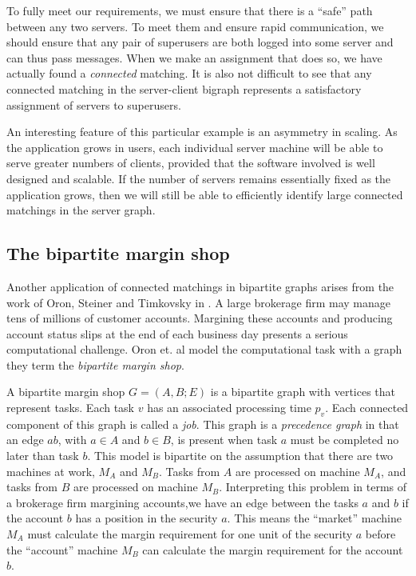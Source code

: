 To fully meet our requirements, we must ensure that there is a ``safe'' path between any two servers.  To meet them and ensure rapid communication, we should ensure that any pair of superusers are both logged into some server and can thus pass messages.  When we make an assignment that does so, we have actually found a {\it connected} matching.  It is also not difficult to see that any connected matching in the server-client bigraph represents a satisfactory assignment of servers to superusers. 

An interesting feature of this particular example is an asymmetry in scaling.  As the application grows in users, each individual server machine will be able to serve greater numbers of clients, provided that the software involved is well designed and scalable.  If the number of servers remains essentially fixed as the application grows, then we will still be able to efficiently identify large connected matchings in the server graph.
	\subsection{The bipartite margin shop}

Another application of connected matchings in bipartite graphs arises from the work of Oron, Steiner and Timkovsky in \cite{OST}.  A large brokerage firm may manage tens of millions of customer accounts.  Margining these accounts and producing account status slips at the end of each business day presents a serious computational challenge.  Oron et. al model the computational task with a graph they term the {\it bipartite margin shop}.

A bipartite margin shop $G = (A, B; E)$ is a bipartite graph with vertices that represent tasks.  Each task $v$ has an associated processing time $p_v$.  Each connected component of this graph is called a {\it job}.  This graph is a {\it precedence graph}  in that an edge $ab$, with $a \in A$ and $b\in B$, is present when task $a$ must be completed no later than task $b$.  This model is bipartite on the assumption that there are two machines at work, $M_A$ and $M_B$.  Tasks from $A$ are processed on machine $M_A$, and tasks from $B$ are processed on machine $M_B$.  Interpreting this problem in terms of a brokerage firm margining accounts,we have an edge between the tasks $a$ and $b$ if the account $b$ has a position in the security $a$. This means the ``market'' machine $M_A$ must calculate the margin requirement for one unit of the security $a$
before the ``account'' machine $M_B$ can calculate the margin requirement for the account $b$.

